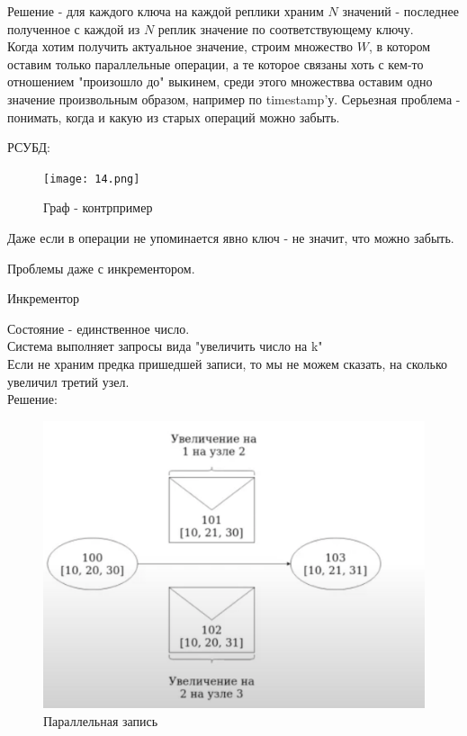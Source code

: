         Решение - для каждого ключа на каждой реплики храним $N$ значений - последнее полученное с каждой из $N$ реплик значение по соответствующему ключу. \\
        Когда хотим получить актуальное значение, строим множество $W$, в котором оставим только параллельные операции, а те которое связаны хоть с кем-то отношением "произошло до" выкинем, среди этого множествва оставим одно значение произвольным образом, например по timestamp'у.
    Серьезная проблема - понимать, когда и какую из старых операций можно забыть.\\
    \begin{example}
      РСУБД:\\
      \begin{figure}[h]
          \centering
          \texttt{[image: 14.png]}
          \caption{Граф - контрпример}
      \end{figure}
      Даже если в операции не упоминается явно ключ - не значит, что можно забыть.\\
    \end{example}
    Проблемы даже с инкрементором.\\
    \begin{definition}
    Инкрементор
    \end{definition}
      Состояние - единственное число.\\
      Система выполняет запросы вида "увеличить число на k"\\
      Если не храним предка пришедшей записи, то мы не можем сказать, на сколько увеличил третий узел.\\
      Решение:\\
      \begin{figure}[h]
          \centering
          \includegraphics[scale = 0.5]{../assets/15.png}
          \caption{Параллельная запись}
      \end{figure}
